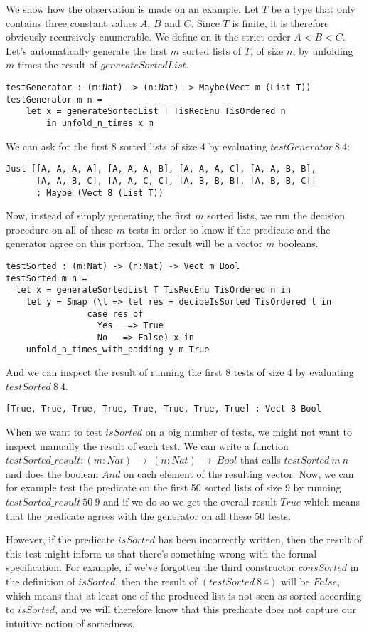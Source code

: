 We show how the observation is made on an example. Let $T$ be a type that only contains three constant values $A$, $B$ and $C$. Since $T$ is finite, it is therefore obviously recursively enumerable. We define on it the strict order $A < B < C$.
Let's automatically generate the first $m$ sorted lists of $T$, of size $n$, by unfolding $m$ times the result of $generateSortedList$.


\begin{lstlisting}
testGenerator : (m:Nat) -> (n:Nat) -> Maybe(Vect m (List T))
testGenerator m n = 
	let x = generateSortedList T TisRecEnu TisOrdered n 
	    in unfold_n_times x m
\end{lstlisting}
We can ask for the first 8 sorted lists of size 4 by evaluating $testGenerator\ 8\ 4$:

\begin{lstlisting}
Just [[A, A, A, A], [A, A, A, B], [A, A, A, C], [A, A, B, B],
      [A, A, B, C], [A, A, C, C], [A, B, B, B], [A, B, B, C]] 
      : Maybe (Vect 8 (List T))
\end{lstlisting}
Now, instead of simply generating the first $m$ sorted lists, we run the decision procedure on all of these $m$ tests in order to know if the predicate and the generator agree on this portion. The result will be a vector $m$ booleans.

\begin{lstlisting}
testSorted : (m:Nat) -> (n:Nat) -> Vect m Bool
testSorted m n = 
  let x = generateSortedList T TisRecEnu TisOrdered n in
    let y = Smap (\l => let res = decideIsSorted TisOrdered l in
			    case res of
			      Yes _ => True
			      No _ => False) x in
	unfold_n_times_with_padding y m True
\end{lstlisting}
And we can inspect the result of running the first 8 tests of size 4 by evaluating $testSorted\ 8\ 4$.

\begin{lstlisting}
[True, True, True, True, True, True, True, True] : Vect 8 Bool
\end{lstlisting}


When we want to test $isSorted$ on a big number of tests, we might not want to inspect manually the result of each test. We can write a function $testSorted\_result : (m:Nat)\ \rightarrow\ (n:Nat)\ \rightarrow\ Bool$ that calls $testSorted\ m\ n$ and does the boolean $And$ on each element of the resulting vector. Now, we can for example test the predicate on the first 50 sorted lists of size 9 by running $testSorted\_result\ 50\ 9$ and if we do so we get the overall result $True$ which means that the predicate agrees with the generator on all these 50 tests.

However, if the predicate $isSorted$ has been incorrectly written, then the result of this test might inform us that there's something wrong with the formal specification. For example, if we've forgotten the third constructor $consSorted$ in the definition of $isSorted$, then the result of $(testSorted\ 8\ 4)$ will be $False$, which means that at least one of the produced list is not seen as sorted according to $isSorted$, and we will therefore know that this predicate  does not capture our intuitive notion of sortedness.
